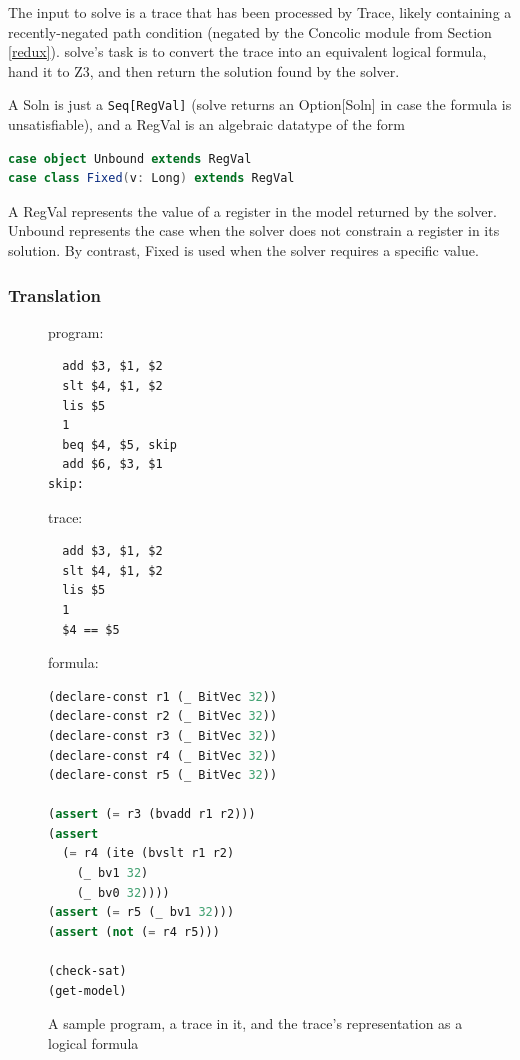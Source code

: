 \documentclass{llncs}
\begin{document}
The input to \textsf{solve} is a trace that has been processed by \textsf{Trace}, likely containing a recently-negated path condition (negated by the \textsf{Concolic} module from Section \ref{redux}). \textsf{solve}'s task is to convert the trace into an equivalent logical formula, hand it to \textsf{Z3}, and then return the solution found by the solver.

A \textsf{Soln} is just a \lstinline{Seq[RegVal]} (\textsf{solve} returns an \textsf{Option[Soln] in case the formula is unsatisfiable}), and a \textsf{RegVal} is an algebraic datatype of the form

\begin{lstlisting}[language=scala]
case object Unbound extends RegVal
case class Fixed(v: Long) extends RegVal
\end{lstlisting}

A \textsf{RegVal} represents the value of a register in the model returned by the solver. \textsf{Unbound} represents the case when the solver does not constrain a register in its solution. By contrast, \textsf{Fixed} is used when the solver requires a specific value.

\subsubsection{Translation}

\begin{figure}
\begin{multicols}{3}
program:
\begin{lstlisting}
  add $3, $1, $2
  slt $4, $1, $2
  lis $5
  1
  beq $4, $5, skip
  add $6, $3, $1
skip:
\end{lstlisting}

\vfill\null
\columnbreak

trace:
\begin{lstlisting}
  add $3, $1, $2
  slt $4, $1, $2
  lis $5
  1
  $4 == $5
\end{lstlisting}

\vfill\null
\columnbreak

formula:
\begin{lstlisting}[language=Lisp]
(declare-const r1 (_ BitVec 32))
(declare-const r2 (_ BitVec 32))
(declare-const r3 (_ BitVec 32))
(declare-const r4 (_ BitVec 32))
(declare-const r5 (_ BitVec 32))

(assert (= r3 (bvadd r1 r2)))
(assert
  (= r4 (ite (bvslt r1 r2)
    (_ bv1 32)
    (_ bv0 32))))
(assert (= r5 (_ bv1 32)))
(assert (not (= r4 r5)))

(check-sat)
(get-model)
\end{lstlisting}
\end{multicols}
\caption{A sample program, a trace in it, and the trace's representation as a logical formula}
\end{figure}
\end{document}
